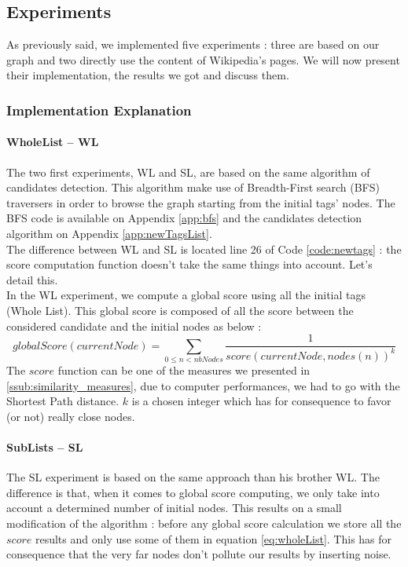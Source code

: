 \subsection{Experiments} %
\label{sub:experiments}
As previously said, we implemented five experiments : three are based on our graph and two directly use the content of Wikipedia's pages. We will now present their implementation, the results we got and discuss them.
\subsubsection{Implementation Explanation} %
\label{ssub:implementation_explanation}
\paragraph{WholeList -- WL} %
\label{par:wholelist_wl}
The two first experiments, WL and SL, are based on the same algorithm of candidates detection. This algorithm make use of Breadth-First search (BFS) traversers in order to browse the graph starting from the initial tags' nodes. The BFS code is available on Appendix \ref{app:bfs} and the candidates detection algorithm on Appendix \ref{app:newTagsList}.\\
The difference between WL and SL is located line 26 of Code \ref{code:newtags} : the score computation function doesn't take the same things into account. Let's detail this.\\
In the WL experiment, we compute a global score using all the initial tags (Whole List). This global score is composed of all the score between the considered candidate and the initial nodes as below :
\begin{equation}
\label{eq:wholeList}
globalScore(currentNode) = \sum_{0\le n< nbNodes} \frac{1}{score(currentNode, nodes(n))^k}
\end{equation}
The $score$ function can be one of the measures we presented in \ref{ssub:similarity_measures}, due to computer performances, we had to go with the Shortest Path distance. $k$ is a chosen integer which has for consequence to favor (or not) really close nodes.
\paragraph{SubLists -- SL} %
\label{par:sublists_sl}
The SL experiment is based on the same approach than his brother WL. The difference is that, when it comes to global score computing, we only take into account a determined number of initial nodes. This results on a small modification of the algorithm : before any global score calculation we store all the $score$ results and only use some of them in equation \eqref{eq:wholeList}. This has for consequence that the very far nodes don't pollute our results by inserting noise. 
